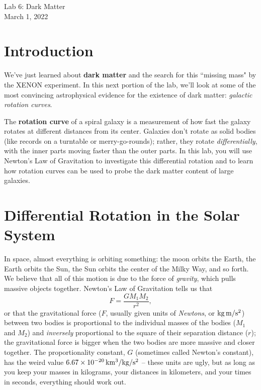 \documentclass[11pt]{article}%
\begin{document}
\begin{center}
\huge{Lab 6: Dark Matter}\\ \medskip \Large{March 1, 2022}
\end{center}

\section{Introduction}
\noindent
We've just learned about \textbf{dark matter} and the search for this ``missing mass" by the XENON experiment. In this next portion of the lab, we'll look at some of the most convincing astrophysical evidence for the existence of dark matter: \textit{galactic rotation curves}.

\medskip \noindent
The \textbf{rotation curve} of a spiral galaxy is a measurement of how fast the galaxy rotates at different distances from its center.  Galaxies don't rotate as solid bodies (like records on a turntable or merry-go-rounds); rather, they rotate \textit{differentially}, with the inner parts moving faster than the outer parts. In this lab, you will use Newton's Law of Gravitation to investigate this differential rotation and to learn how rotation curves can be used to probe the dark matter content of large galaxies.

\section{Differential Rotation in the Solar System}
\noindent
In space, almost everything is orbiting something: the moon orbits the Earth, the Earth orbits the Sun, the Sun orbits the center of the Milky Way, and so forth. We believe that all of this motion is due to the force of \emph{gravity}, which pulls massive objects together. Newton's Law of Gravitation tells us that
\begin{equation}
F = \frac{G M_1 M_2}{r^2},
\end{equation}
or that the gravitational force ($F$, usually given units of \emph{Newtons}, or $\rm kg \, m/s^2$) between two bodies is proportional to the individual masses of the bodies ($M_1$ and $M_2$) and \emph{inversely} proportional to the square of their separation distance ($r$); the gravitational force is bigger when the two bodies are more massive and closer together. The proportionality constant, $G$ (sometimes called Newton's constant), has the weird value $6.67 \times 10^{-20} \, {\rm km^3/kg/s^2}$ -- these units are ugly, but as long as you keep your masses in kilograms, your distances in kilometers, and your times in seconds, everything should work out.
\end{document}
